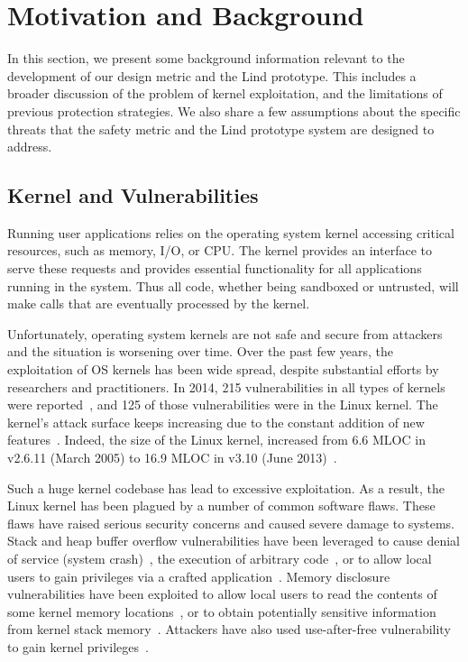 \section{Motivation and Background}
\label{sec.motivation-and-background}

In this section, we present some background information 
relevant to the development of our design metric and the Lind prototype. 
This includes a broader discussion of the problem of kernel exploitation, 
and the limitations of previous protection strategies. 
We also share a few assumptions about the specific threats 
that the safety metric and the Lind prototype system are designed to
address.

\subsection{Kernel and Vulnerabilities}

Running user applications relies on the operating system kernel 
accessing critical resources, such as memory, I/O, or CPU. 
The kernel provides an interface to serve these requests 
and provides essential functionality for all applications running in the
system. 
Thus all code, whether being sandboxed or untrusted, will make calls 
that are eventually processed by the kernel. 

Unfortunately, operating system kernels are not safe and secure from
attackers and the situation is worsening over time. 
Over the past few years, the exploitation of OS kernels has been wide
spread, 
despite substantial efforts by researchers and practitioners. 
In 2014, 215 vulnerabilities in all types of kernels were reported~\cite{NVD}, 
and 125 of those vulnerabilities were in the Linux kernel. 
The kernel's
attack surface keeps increasing due to the constant addition of new
features~\cite{Metrics-13}. 
Indeed, the size of the Linux kernel, increased from 6.6 MLOC in v2.6.11 
(March 2005) to 16.9 MLOC in v3.10 (June 2013)~\cite{Linux-13}. 


Such a huge kernel codebase has lead to excessive exploitation. 
As a result, the Linux kernel has been plagued by a number of common
software flaws. 
These flaws have raised serious security concerns and caused severe damage
to systems. 
Stack and heap buffer overflow vulnerabilities have been leveraged to 
cause denial of service (system crash)~\cite{CVE-2013-2892}, 
the execution of arbitrary code~\cite{CVE-2009-3234}, 
or to allow local users to gain privileges via a crafted 
application~\cite{CVE-2013-1828}. 
Memory disclosure vulnerabilities have been exploited to allow local users
to read 
the contents of some kernel memory locations~\cite{CVE-2009-3002}, or to
obtain potentially 
sensitive information from kernel stack memory~\cite{CVE-2010-4073}. 
Attackers have also used use-after-free vulnerability to gain kernel
privileges~\cite{CVE-2013-4343}.

